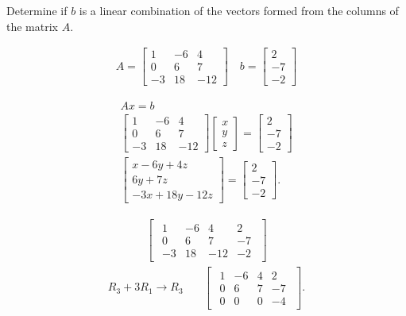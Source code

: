 \documentclass{zc-ust-hw}
\begin{document}
    Determine if $b$ is a linear combination of the vectors formed from the
    columns of the matrix $A$.

    \begin{align*}
      A=\begin{bmatrix}1&-6&4\\0&6&7\\-3&18&-12\end{bmatrix}
      \quad
      b=\begin{bmatrix}2\\-7\\-2\end{bmatrix}
    \end{align*}

    \begin{gather}
      Ax=b\\
      \begin{bmatrix}1&-6&4\\0&6&7\\-3&18&-12\end{bmatrix}
      \begin{bmatrix}x\\y\\z\end{bmatrix}
      =\begin{bmatrix}2\\-7\\-2\end{bmatrix} \\
      \begin{bmatrix}x-6y+4z\\6y+7z\\-3x+18y-12z\end{bmatrix}
      =\begin{bmatrix}2\\-7\\-2\end{bmatrix}
    .\end{gather}

    \begin{align}
      \begin{bmatrix} 
        \begin{array}{ccc|c}
          1 & -6 & 4 & 2 \\
          0 & 6 & 7 & -7 \\
          -3 & 18 & -12 & -2
        \end{array}
      \end{bmatrix} 
    \end{align}
    \begin{align}
      R_3+3R_1\rightarrow R_3
      & \quad
      \begin{bmatrix} 
        \begin{array}{ccc|c}
          1 & -6 & 4 & 2 \\
          0 & 6 & 7 & -7 \\
          0 & 0 & 0 & -4
        \end{array}
      \end{bmatrix}
    .\end{align}
\end{document}
